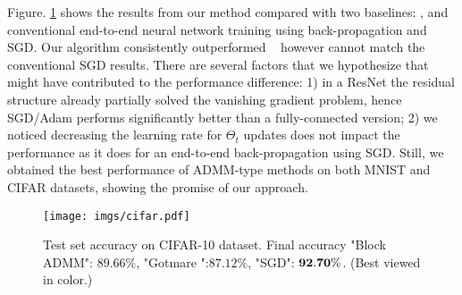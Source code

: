 Figure. \ref{fig:cifar} shows the results from our method compared with two baselines: \cite{gotmare2018decoupling}, and conventional end-to-end neural network training using back-propagation and SGD. Our algorithm consistently outperformed ~\cite{gotmare2018decoupling} however cannot match the conventional SGD results. There are several factors that we hypothesize that might have contributed to the performance difference: 1) in a ResNet the residual structure already partially solved the vanishing gradient problem, hence SGD/Adam performs significantly better than a fully-connected version; 
2) we noticed decreasing the learning rate for $\Theta_t$ updates does not impact the performance as it does for an end-to-end back-propagation using SGD. Still, we obtained the best performance of ADMM-type methods on both MNIST and CIFAR datasets, showing the promise of our approach.



\begin{figure}[htb]
\begin{center}
\centerline{
\texttt{[image: imgs/cifar.pdf]}
}
\caption{Test set accuracy on CIFAR-10 dataset. Final accuracy "Block ADMM": $89.66\%$, "Gotmare \etal":$87.12 \%$, "SGD": $\bf 92.70\%$. (Best viewed in color.)}
\label{fig:cifar}
\end{center}
\end{figure}

 
 
 

